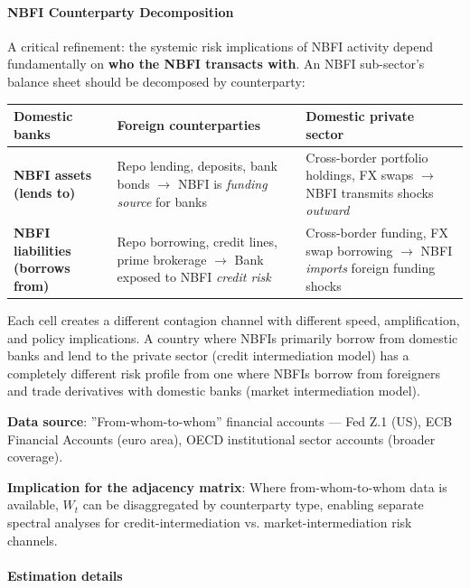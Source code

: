 \documentclass[11pt,a4paper]{article}
\begin{document}
\paragraph{NBFI Counterparty Decomposition}

A critical refinement: the systemic risk implications of NBFI activity depend fundamentally on \textbf{who the NBFI transacts with}. An NBFI sub-sector's balance sheet should be decomposed by counterparty:


{\small
\begin{longtable}{|p{}|p{}|p{}|}
\hline
\textbf{Domestic banks} & \textbf{Foreign counterparties} & \textbf{Domestic private sector} \\
\hline
\endhead
\textbf{NBFI assets (lends to)} & Repo lending, deposits, bank bonds $\rightarrow$ NBFI is \textit{funding source} for banks & Cross-border portfolio holdings, FX swaps $\rightarrow$ NBFI transmits shocks \textit{outward} \\
\hline
\textbf{NBFI liabilities (borrows from)} & Repo borrowing, credit lines, prime brokerage $\rightarrow$ Bank exposed to NBFI \textit{credit risk} & Cross-border funding, FX swap borrowing $\rightarrow$ NBFI \textit{imports} foreign funding shocks \\
\hline
\end{longtable}
}

Each cell creates a different contagion channel with different speed, amplification, and policy implications. A country where NBFIs primarily borrow from domestic banks and lend to the private sector (credit intermediation model) has a completely different risk profile from one where NBFIs borrow from foreigners and trade derivatives with domestic banks (market intermediation model).

\textbf{Data source}: ''From-whom-to-whom'' financial accounts --- Fed Z.1 (US), ECB Financial Accounts (euro area), OECD institutional sector accounts (broader coverage).

\textbf{Implication for the adjacency matrix}: Where from-whom-to-whom data is available, $W_t$ can be disaggregated by counterparty type, enabling separate spectral analyses for credit-intermediation vs. market-intermediation risk channels.


\paragraph{Estimation details}
\end{document}
